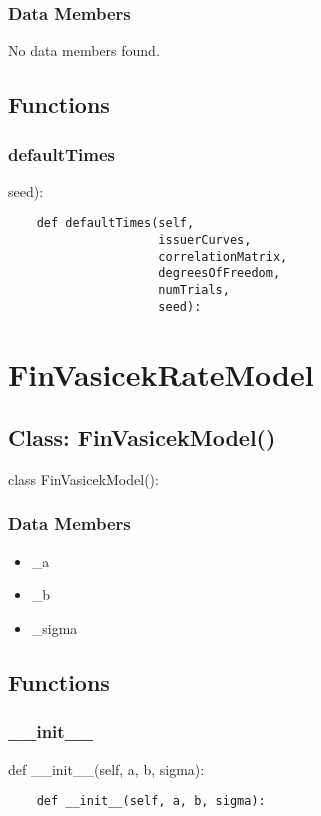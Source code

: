 \documentclass[twoside,11pt]{book}
\begin{document}
\subsubsection*{Data Members}
No data members found.

\subsection*{Functions}

\subsubsection*{{\bf defaultTimes}}
seed): 

\begin{lstlisting}
    def defaultTimes(self,
                     issuerCurves,
                     correlationMatrix,
                     degreesOfFreedom,
                     numTrials,
                     seed):
\end{lstlisting}

\newpage
\section{FinVasicekRateModel}

\subsection*{Class: FinVasicekModel()}
class FinVasicekModel(): 

\subsubsection*{Data Members}
\begin{itemize}
\item{\_a}
\item{\_b}
\item{\_sigma}
\end{itemize}

\subsection*{Functions}

\subsubsection*{{\bf \_\_init\_\_}}
def \_\_init\_\_(self, a, b, sigma): 

\begin{lstlisting}
    def __init__(self, a, b, sigma):
\end{lstlisting}
\end{document}

